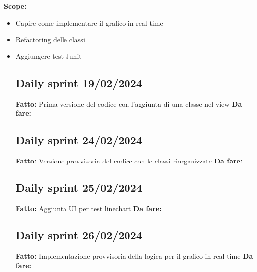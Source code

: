 \documentclass{report}
\begin{document}
\textbf{Scope:}
\begin{itemize}
\item Capire come implementare il grafico in real time
\item Refactoring delle classi
\item Aggiungere test Junit

\subsection{Daily sprint 19/02/2024}
\textbf{Fatto:} Prima versione del codice con l'aggiunta di una classe nel view
\textbf{Da fare:} 
\subsection{Daily sprint 24/02/2024}
\textbf{Fatto:} Versione provvisoria del codice con le classi riorganizzate
\textbf{Da fare:} 
\subsection{Daily sprint 25/02/2024}
\textbf{Fatto:} Aggiunta UI per test linechart
\textbf{Da fare:} 
\subsection{Daily sprint 26/02/2024}
\textbf{Fatto:} Implementazione provvisoria della logica per il grafico in real time
\textbf{Da fare:} 

\end{itemize}
\end{document}
